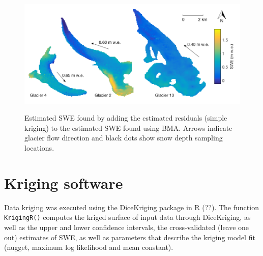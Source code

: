 \documentclass[12pt]{article}
\newcommand{\topomap}{Arrows indicate glacier flow direction and black dots show snow depth sampling locations. }
\begin{document}
\begin{figure}
	\centering
	\includegraphics[width = \textwidth]{RegressionKriging.png}\\
	\caption{Estimated SWE found by adding the estimated residuals (simple kriging) to the estimated SWE found using BMA. \topomap}
	\label{fig:Regression-Kriging}
\end{figure}


\section{Kriging software}
\label{sec:KrigingMethods}
Data kriging was executed using the DiceKriging package in R (??). The function \texttt{KrigingR()} computes the kriged surface of input data through DiceKriging, as well as the upper and lower confidence intervals, the cross-validated (leave one out) estimates of SWE, as well as parameters that describe the kriging model fit (nugget, maximum log likelihood and mean constant). 



\end{document}

